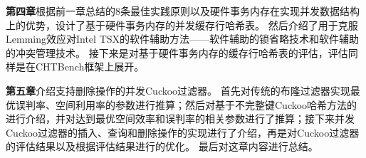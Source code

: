 \textbf{第四章}根据前一章总结的8条最佳实践原则以及硬件事务内存在实现并发数据结构上的优势，设计了基于硬件事务内存的并发缓存行哈希表。
然后介绍了用于克服Lemming效应对Intel TSX的软件辅助方法——软件辅助的锁省略技术和软件辅助的冲突管理技术。
接下来是对基于硬件事务内存的缓存行哈希表的评估，评估同样是在CHTBench框架上展开。

\textbf{第五章}介绍支持删除操作的并发Cuckoo过滤器。
首先对传统的布隆过滤器实现最优误判率、空间利用率的参数进行推算；然后对基于不完整键Cuckoo哈希方法的进行介绍，并对达到最优空间效率和误判率的相关参数进行了推算；接下来并发Cuckoo过滤器的插入、查询和删除操作的实现进行了介绍，再是对Cuckoo过滤器的评估结果以及根据评估结果进行的优化。
最后对这章内容进行总结。

